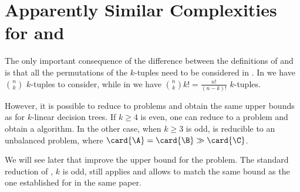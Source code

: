 \section{Apparently Similar Complexities for \kSUM and \kLDT}

The only important consequence of the difference between the definitions of
\kSUM and \kLDT is that all the permutations of the $k$-tuples need to be
considered in \kLDT. In \kSUM we have $\binom{n}{k}$ $k$-tuples to consider,
while in \kLDT we have $\binom{n}{k} k! = \frac{n!}{(n-k)!}$ $k$-tuples.

However, it is possible to reduce \kLDT to \kSUM problems and obtain the same
upper bounds as \kSUM for $k$-linear decision trees. If $k \ge 4$ is even, one
can reduce \kLDT to a \twoSUM problem and obtain a 
algorithm. In the other case, when $k \ge 3$ is odd, \kLDT is reducible to an
unbalanced \threeSUM problem, where $\card{\A} = \card{\B} \gg \card{\C}$.

We will see later that \citet*{gronlund:2014} improve the upper bound for the
\threeSUM problem. The standard reduction of \kLDT, $k$ is odd, still applies
and allows to match the same 
bound as the one established for \threeSUM in the same paper.

